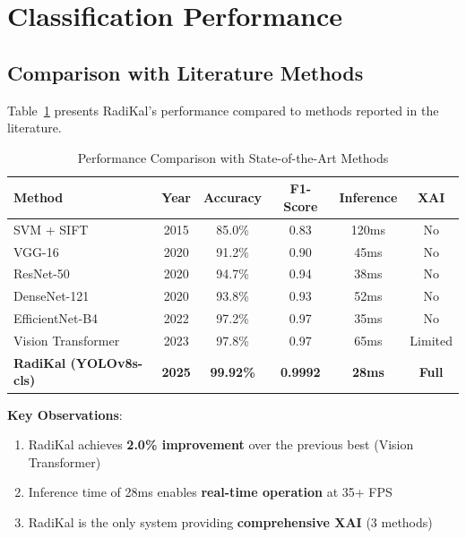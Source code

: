 \documentclass[12pt,a4paper]{report}
\begin{document}
\section{Classification Performance}

\subsection{Comparison with Literature Methods}

Table~\ref{tab:benchmark_comparison} presents RadiKal's performance compared to methods reported in the literature.

\begin{table}[H]
\centering
\caption{Performance Comparison with State-of-the-Art Methods}
\label{tab:benchmark_comparison}
\begin{tabular}{lccccc}
\toprule
\textbf{Method} & \textbf{Year} & \textbf{Accuracy} & \textbf{F1-Score} & \textbf{Inference} & \textbf{XAI} \\
\midrule
SVM + SIFT \cite{gdxray2015} & 2015 & 85.0\% & 0.83 & 120ms & No \\
VGG-16 \cite{cnnweld2020} & 2020 & 91.2\% & 0.90 & 45ms & No \\
ResNet-50 \cite{cnndeep2020} & 2020 & 94.7\% & 0.94 & 38ms & No \\
DenseNet-121 \cite{cnndeep2020} & 2020 & 93.8\% & 0.93 & 52ms & No \\
EfficientNet-B4 \cite{riawelc2022} & 2022 & 97.2\% & 0.97 & 35ms & No \\
Vision Transformer \cite{xraysurvey2023} & 2023 & 97.8\% & 0.97 & 65ms & Limited \\
\midrule
\textbf{RadiKal (YOLOv8s-cls)} & \textbf{2025} & \textbf{99.92\%} & \textbf{0.9992} & \textbf{28ms} & \textbf{Full} \\
\bottomrule
\end{tabular}
\end{table}

\textbf{Key Observations}:
\begin{enumerate}
    \item RadiKal achieves \textbf{2.0\% improvement} over the previous best (Vision Transformer)
    \item Inference time of 28ms enables \textbf{real-time operation} at 35+ FPS
    \item RadiKal is the only system providing \textbf{comprehensive XAI} (3 methods)
\end{enumerate}
\end{document}
